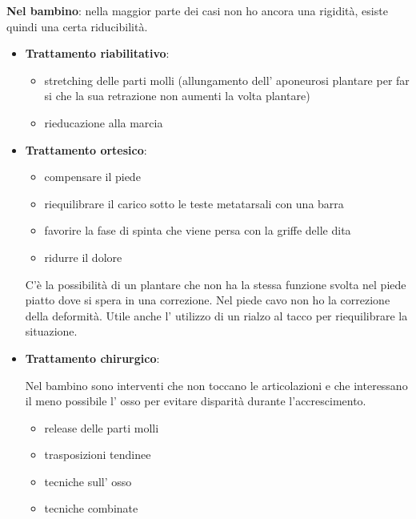 \textbf{Nel bambino}: nella maggior parte dei casi non ho ancora una rigidità, esiste quindi una certa riducibilità.
\begin{itemize}
\item \textbf{Trattamento riabilitativo}:
\begin{itemize}
\item
  stretching delle parti molli (allungamento dell' aponeurosi plantare per far si che la sua retrazione non aumenti la volta plantare)
\item
  rieducazione alla marcia
\end{itemize}
\item \textbf{Trattamento ortesico}:
\begin{itemize}
\item
  compensare il piede
\item
  riequilibrare il carico sotto le teste metatarsali con una barra
\item
  favorire la fase di spinta che viene persa con la griffe delle dita
\item
  ridurre il dolore
\end{itemize}

C'è la possibilità di un plantare che non ha la stessa funzione svolta nel piede piatto dove si spera in una correzione. Nel piede cavo non ho la correzione della deformità. Utile anche l' utilizzo di un rialzo al tacco per riequilibrare la situazione.

\item \textbf{Trattamento chirurgico}:

Nel bambino sono interventi che non toccano le articolazioni e che interessano il meno possibile l' osso per evitare disparità durante l'accrescimento.

\begin{itemize}
\item
  release delle parti molli
\item
  trasposizioni tendinee
\item
  tecniche sull' osso
\item
  tecniche combinate
\end{itemize}
\end{itemize}

